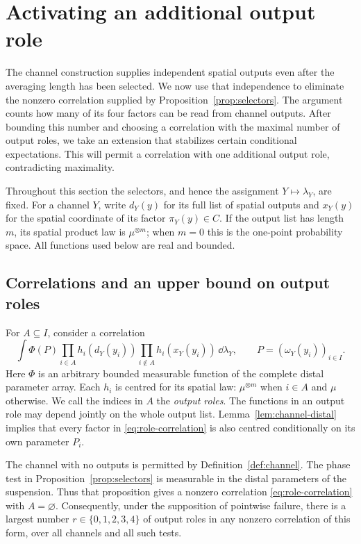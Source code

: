 \section{Activating an additional output role}
\label{sec:activation}

The channel construction supplies independent spatial outputs even after
the averaging length has been selected. We now use that independence to
eliminate the nonzero correlation supplied by Proposition~\ref{prop:selectors}.
The argument counts how many of its four factors can be read from channel
outputs. After bounding this number and choosing a correlation with the
maximal number of output roles, we take an extension that stabilizes
certain conditional expectations. This will permit a correlation with
one additional output role, contradicting maximality.

Throughout this section the selectors, and hence the assignment
$Y\mapsto\lambda_Y$, are fixed. For a channel $Y$, write $d_Y(y)$ for
its full list of spatial outputs and $x_Y(y)$ for the spatial coordinate
of its factor $\pi_Y(y)\in C$. If the output list has length $m$, its
spatial product law is $\mu^{\otimes m}$; when $m=0$ this is the
one-point probability space. All functions used below are real and
bounded.

\subsection{Correlations and an upper bound on output roles}

For $A\subseteq I$, consider a correlation
\begin{equation}\label{eq:role-correlation}
 \int \Phi(P)\prod_{i\in A}h_i(d_Y(y_i))
                  \prod_{i\notin A}h_i(x_Y(y_i))\,\dd\lambda_Y,
 \qquad P=(\omega_Y(y_i))_{i\in I}.
\end{equation}
Here $\Phi$ is an arbitrary bounded measurable function of the complete
distal parameter array. Each $h_i$ is centred for its spatial law:
$\mu^{\otimes m}$ when $i\in A$ and $\mu$ otherwise. We call the
indices in $A$ the \emph{output roles}. The functions in an output role
may depend jointly on the whole output list. Lemma~\ref{lem:channel-distal}
implies that every factor in \eqref{eq:role-correlation} is also centred
conditionally on its own parameter $P_i$.

The channel with no outputs is permitted by Definition~\ref{def:channel}.
The phase test in Proposition~\ref{prop:selectors} is measurable in the
distal parameters of the suspension. Thus that proposition gives a
nonzero correlation \eqref{eq:role-correlation} with $A=\varnothing$.
Consequently, under the supposition of pointwise failure, there is a
largest number $r\in\{0,1,2,3,4\}$ of output roles in any nonzero
correlation of this form, over all channels and all such tests.

